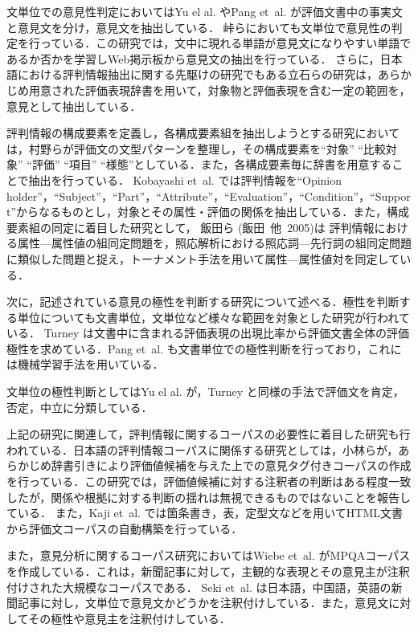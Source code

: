\documentclass[japanese]{jnlp_1.4}
\begin{document}
文単位での意見性判定においてはYu el al. やPang et~al. が評価文書中の事実文と意見文を分け，意見文を抽出している．
峠らにおいても文単位で意見性の判定を行っている．この研究では，文中に現れる単語が意見文になりやすい単語であるか否かを学習しWeb掲示板から意見文の抽出を行っている．
さらに，日本語における評判情報抽出に関する先駆けの研究でもある立石らの研究は，あらかじめ用意された評価表現辞書を用いて，対象物と評価表現を含む一定の範囲を，意見として抽出している．

評判情報の構成要素を定義し，各構成要素組を抽出しようとする研究においては，村野らが評価文の文型パターンを整理し，その構成要素を``対象'' ``比較対象'' ``評価'' ``項目'' ``様態''としている．また，各構成要素毎に辞書を用意することで抽出を行っている．
Kobayashi et~al. では評判情報を``Opinion holder''，``Subject''，``Part''，``Attribute''，``Evaluation''，``Condition''，``Support''からなるものとし，対象とその属性・評価の関係を抽出している．また，構成要素組の同定に着目した研究として，
    飯田ら (飯田\ 他\ 2005)\nocite{Iida05}は
評判情報における属性—属性値の組同定問題を，照応解析における照応詞—先行詞の組同定問題に類似した問題と捉え，トーナメント手法を用いて属性—属性値対を同定している．

次に，記述されている意見の極性を判断する研究について述べる．極性を判断する単位についても文書単位，文単位など様々な範囲を対象とした研究が行われている．
Turney は文書中に含まれる評価表現の出現比率から評価文書全体の評価極性を求めている．Pang et~al. も文書単位での極性判断を行っており，これには機械学習手法を用いている．

文単位の極性判断としてはYu el al. が，Turney と同様の手法で評価文を肯定，否定，中立に分類している．

上記の研究に関連して，評判情報に関するコーパスの必要性に着目した研究も行われている．日本語の評判情報コーパスに関係する研究としては，小林らが，あらかじめ辞書引きにより評価値候補を与えた上での意見タグ付きコーパスの作成を行っている．この研究では，評価値候補に対する注釈者の判断はある程度一致したが，関係や根拠に対する判断の揺れは無視できるものではないことを報告している．
また，Kaji et~al. では箇条書き，表，定型文などを用いてHTML文書から評価文コーパスの自動構築を行っている．

また，意見分析に関するコーパス研究においてはWiebe et~al. がMPQAコーパスを作成している．これは，新聞記事に対して，主観的な表現とその意見主が注釈付けされた大規模なコーパスである．
Seki et~al. は日本語，中国語，英語の新聞記事に対し，文単位で意見文かどうかを注釈付けしている．また，意見文に対してその極性や意見主を注釈付けしている．
\end{document}

